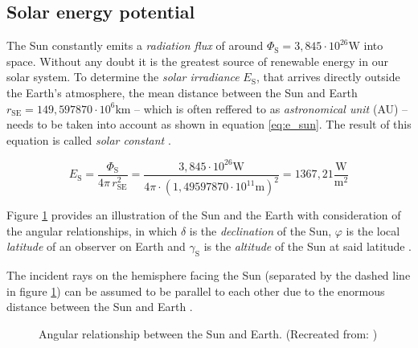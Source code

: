 \subsection{Solar energy potential}

The Sun constantly emits a \emph{radiation flux} of around $\Phi_{\mathrm{S}} = 3,845 \cdot 10^{26} \mathrm{W}$ into space. Without any doubt it is the greatest source of renewable energy in our solar system. To determine the \emph{solar irradiance} $E_\mathrm{S}$, that arrives directly outside the Earth's atmosphere, the mean distance between the Sun and Earth $r_{\mathrm{SE}} = 149,597870 \cdot 10^{6} \mathrm{km}$ -- which is often reffered to as \emph{astronomical unit} (AU) -- needs to be taken into account as shown in equation \ref{eq:e_sun}. The result of this equation is called \emph{solar constant} \cite{Karttunen:2006, Bertol:2011, Mertens:2015, Wagner:2018}. 

\begin{center}
	\begin{equation} \label{eq:e_sun}
		E_{\mathrm{S}} = \frac{\Phi_{\mathrm{S}}}{4 \pi \, r_{\mathrm{SE}}^2} = \frac{3,845 \cdot 10^{26} \mathrm{W}}{4 \pi \cdot (1,49597870 \cdot 10^{11} \mathrm{m})^2} = 1367,21 \frac{\mathrm{W}}{\mathrm{m}^2}
	\end{equation}
\end{center}

Figure \ref{fig:tikz_angular_relationship} provides an illustration of the Sun and the Earth with consideration of the angular relationships, in which $\delta$ is the \emph{declination} of the Sun, $\varphi$ is the local \emph{latitude} of an observer on Earth and $\gamma_{\mathrm{S}}$ is the \emph{altitude} of the Sun at said latitude \cite{Appelbaum:1993, Karttunen:2006, Mertens:2015, Wagner:2018}. 

The incident rays on the hemisphere facing the Sun (separated by the dashed line in figure \ref{fig:tikz_angular_relationship}) can be assumed to be parallel to each other due to the enormous distance between the Sun and Earth \cite{Mertens:2015, Wagner:2018}.

\begin{figure}[h!]
	\centering
	
	\caption{Angular relationship between the Sun and Earth. (Recreated from: \cite{Mertens:2015})}
	\label{fig:tikz_angular_relationship}
\end{figure} 